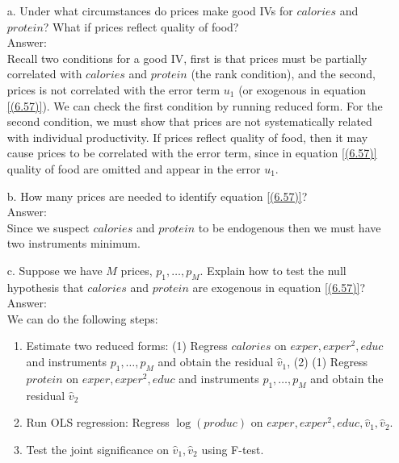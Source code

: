 \documentclass[10pt]{article}
\begin{document}
\begin{enumerate}
\item[a.] Under what circumstances do prices make good IVs for $calories$ and $protein$? What if prices reflect quality of food?
\\ Answer: \\
Recall two conditions for a good IV, first is that prices must be partially correlated with $calories$ and $protein$ (the rank condition), and the second, prices is not correlated with the error term $u_1$ (or exogenous in equation \eqref{(6.57)}). We can check the first condition by running reduced form. For the second condition, we must show that prices are not systematically related with individual productivity. If prices reflect quality of food, then it may cause prices to be correlated with the error term, since in equation \eqref{(6.57)} quality of food are omitted and appear in the error $u_1$.

\item[b.] How many prices are needed to identify equation \eqref{(6.57)}?
\\ Answer: \\
Since we suspect $calories$ and $protein$ to be endogenous then we must have two instruments minimum. 

\item[c.] Suppose we have $M$ prices, $p_1,\ldots,p_M.$ Explain how to test the null hypothesis that $calories$ and $protein$ are exogenous in equation \eqref{(6.57)}?
\\ Answer: \\
We can do the following steps:
\begin{enumerate}
    \item Estimate two reduced forms: (1) Regress $calories$ on $exper,exper^2, educ$ and instruments $p_1,\ldots,p_M$ and obtain the residual $\hat{v}_1$, (2) (1) Regress $protein$ on $exper,exper^2, educ$ and instruments $p_1,\ldots,p_M$ and obtain the residual $\hat{v}_2$
    \item Run OLS regression: Regress $\log(produc)$ on $exper,exper^2,educ,\hat{v}_1,\hat{v}_2.$
    \item Test the joint significance on $\hat{v}_1,\hat{v}_2$ using F-test.
\end{enumerate}
\end{enumerate}\\ 
\end{document}
